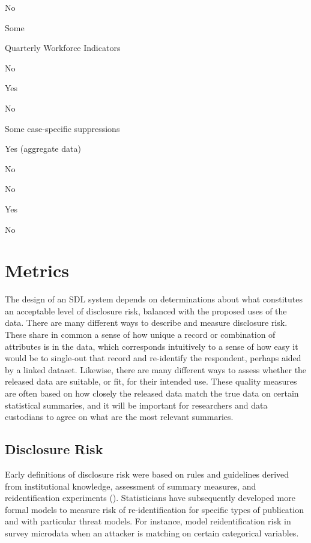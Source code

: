 \documentclass[
]{book}
\begin{document}
No

Some

Quarterly Workforce Indicators

No

Yes

No

Some case-specific suppressions

Yes (aggregate data)

No

No

Yes

No

\hypertarget{metrics}{%
\section{Metrics}\label{metrics}}

The design of an SDL system depends on determinations about what constitutes an acceptable level of disclosure risk, balanced with the proposed uses of the data. There are many different ways to describe and measure disclosure risk. These share in common a sense of how unique a record or combination of attributes is in the data, which corresponds intuitively to a sense of how easy it would be to single-out that record and re-identify the respondent, perhaps aided by a linked dataset. Likewise, there are many different ways to assess whether the released data are suitable, or fit, for their intended use. These quality measures are often based on how closely the released data match the true data on certain statistical summaries, and it will be important for researchers and data custodians to agree on what are the most relevant summaries.

\hypertarget{disclosure-risk}{%
\subsection{Disclosure Risk}\label{disclosure-risk}}

Early definitions of disclosure risk were based on rules and guidelines derived from institutional knowledge, assessment of summary measures, and reidentification experiments (\citet{harris-kojetin_statistical_2005}). Statisticians have subsequently developed more formal models to measure risk of re-identification for specific types of publication and with particular threat models. For instance, \citet{shlomo_assessing_2010} model reidentification risk in survey microdata when an attacker is matching on certain categorical variables.
\end{document}
